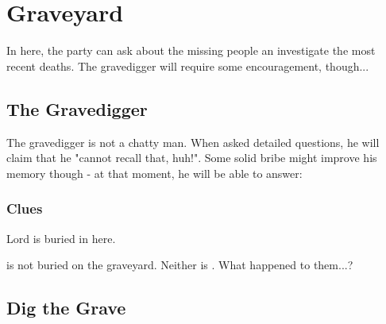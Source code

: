 \section{Graveyard}
\label{sec:graveyard}

In here, the party can ask about the missing people an investigate the most recent deaths. The gravedigger will require some encouragement, though... 




\subsection{The Gravedigger}

The gravedigger is not a chatty man. When asked detailed questions, he will claim that he "cannot recall that, huh!". Some solid bribe might improve his memory though - at that moment, he will be able to answer:






\subsubsection{Clues}

Lord \npcKharbranthNoble{} is buried in here.

\npcOrphanSick{} is not buried on the graveyard. Neither is \npcGhostbloodWounded{}. What happened to them...?





\subsection{Dig the Grave}
\label{ssec:graveyardEmptyGrave}

